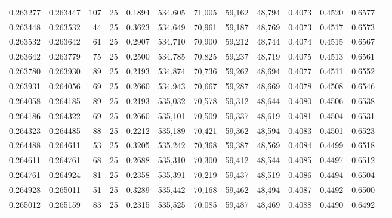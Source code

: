 \begin{tabular}{rrrrrrrrrrrrr}
0.263277 & 0.263447 &   107 &  25 &                                     0.1894 & 534,605 &  71,005 &  59,162 &  48,794 & 0.4073 & 0.4520 & 0.6577 \\
0.263448 & 0.263532 &    44 &  25 &                                     0.3623 & 534,649 &  70,961 &  59,187 &  48,769 & 0.4073 & 0.4517 & 0.6573 \\
0.263532 & 0.263642 &    61 &  25 &                                     0.2907 & 534,710 &  70,900 &  59,212 &  48,744 & 0.4074 & 0.4515 & 0.6567 \\
0.263642 & 0.263779 &    75 &  25 &                                     0.2500 & 534,785 &  70,825 &  59,237 &  48,719 & 0.4075 & 0.4513 & 0.6561 \\
0.263780 & 0.263930 &    89 &  25 &                                     0.2193 & 534,874 &  70,736 &  59,262 &  48,694 & 0.4077 & 0.4511 & 0.6552 \\
0.263931 & 0.264056 &    69 &  25 &                                     0.2660 & 534,943 &  70,667 &  59,287 &  48,669 & 0.4078 & 0.4508 & 0.6546 \\
0.264058 & 0.264185 &    89 &  25 &                                     0.2193 & 535,032 &  70,578 &  59,312 &  48,644 & 0.4080 & 0.4506 & 0.6538 \\
0.264186 & 0.264322 &    69 &  25 &                                     0.2660 & 535,101 &  70,509 &  59,337 &  48,619 & 0.4081 & 0.4504 & 0.6531 \\
0.264323 & 0.264485 &    88 &  25 &                                     0.2212 & 535,189 &  70,421 &  59,362 &  48,594 & 0.4083 & 0.4501 & 0.6523 \\
0.264488 & 0.264611 &    53 &  25 &                                     0.3205 & 535,242 &  70,368 &  59,387 &  48,569 & 0.4084 & 0.4499 & 0.6518 \\
0.264611 & 0.264761 &    68 &  25 &                                     0.2688 & 535,310 &  70,300 &  59,412 &  48,544 & 0.4085 & 0.4497 & 0.6512 \\
0.264761 & 0.264924 &    81 &  25 &                                     0.2358 & 535,391 &  70,219 &  59,437 &  48,519 & 0.4086 & 0.4494 & 0.6504 \\
0.264928 & 0.265011 &    51 &  25 &                                     0.3289 & 535,442 &  70,168 &  59,462 &  48,494 & 0.4087 & 0.4492 & 0.6500 \\
0.265012 & 0.265159 &    83 &  25 &                                     0.2315 & 535,525 &  70,085 &  59,487 &  48,469 & 0.4088 & 0.4490 & 0.6492 \\

\end{tabular}

